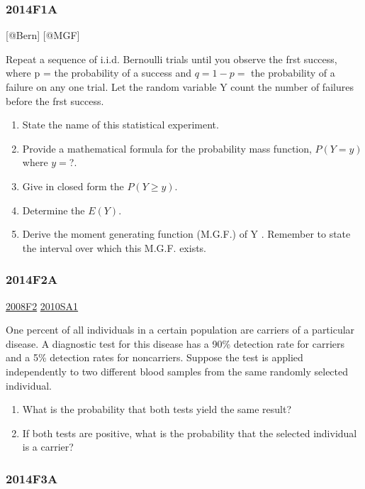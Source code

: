 \documentclass[6pt,Portrait]{article}
\begin{document}
\hypertarget{f1a-1}{%
\subsubsection{2014F1A}\label{f1a-1}}

{[}@Bern{]} {[}@MGF{]}

Repeat a sequence of i.i.d. Bernoulli trials until you observe the frst
success, where p = the probability of a success and \(q=1-p=\) the
probability of a failure on any one trial. Let the random variable Y
count the number of failures before the frst success.

\begin{enumerate}
\def\labelenumi{(\alph{enumi})}
\item
  State the name of this statistical experiment.
\item
  Provide a mathematical formula for the probability mass function,
  \(P(Y=y)\) where \(y=\)?.
\item
  Give in closed form the \(P(Y\ge y)\).
\item
  Determine the \(E(Y)\).
\item
  Derive the moment generating function (M.G.F.) of Y . Remember to
  state the interval over which this M.G.F. exists.
\end{enumerate}

\hypertarget{f2a-1}{%
\subsubsection{2014F2A}\label{f2a-1}}

\protect\hyperlink{f2-3}{2008F2} \protect\hyperlink{sa1-1}{2010SA1}

One percent of all individuals in a certain population are carriers of a
particular disease. A diagnostic test for this disease has a 90\%
detection rate for carriers and a 5\% detection rates for noncarriers.
Suppose the test is applied independently to two different blood samples
from the same randomly selected individual.

\begin{enumerate}
\def\labelenumi{(\alph{enumi})}
\item
  What is the probability that both tests yield the same result?
\item
  If both tests are positive, what is the probability that the selected
  individual is a carrier?
\end{enumerate}

\hypertarget{f3a-1}{%
\subsubsection{2014F3A}\label{f3a-1}}
\end{document}
